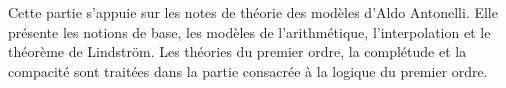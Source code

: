 \documentclass[../../include/open-logic-part]{subfiles}
\begin{document}
\begin{OLPartNotice}{}
Cette partie s'appuie sur les notes de théorie des modèles d'Aldo
Antonelli. Elle présente les notions de base, les modèles de
l'arithmétique, l'interpolation et le théorème de Lindström. Les
théories du premier ordre, la complétude et la compacité sont
traitées dans la partie consacrée à la logique du premier ordre.
\end{OLPartNotice}





\OLEndPartHook
\end{document}
